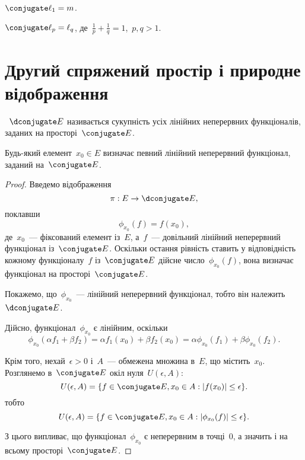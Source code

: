 \begin{example}
    $\conjugate \ell_1 = m$.
\end{example}

\begin{example}
    $\conjugate \ell_p = \ell_q$, де~$\frac{1}{p} + \frac{1}{q} = 1$,~$p, q > 1$.
\end{example}

\section{Другий спряжений простір і природне відображення}

\begin{definition}
    ~$\dconjugate E$ називається сукупність усіх лінійних неперервних функціоналів, заданих на просторі~$\conjugate E$.
\end{definition}

\begin{lemma}
    Будь-який елемент~$x_0 \in E$ визначає певний лінійний неперервний функціонал, заданий на~$\conjugate E$.
\end{lemma}

\begin{proof}
    Введемо відображення
    \begin{equation*}
        \pi: E \to \dconjugate E,
    \end{equation*}
    поклавши
    \begin{equation*}
        \phi_{x_0}(f) = f(x_0),
    \end{equation*}
    де~$x_0$~--- фіксований елемент із~$E$, а~$f$~--- довільний лінійний неперервний функціонал із~$\conjugate E$. Оскільки остання рівність ставить у відповідність кожному функціоналу~$f$ із~$\conjugate E$ дійсне число~$\phi_{x_0}(f)$, вона визначає функціонал на просторі~$\conjugate E$.
    
    Покажемо, що~$\phi_{x_0}$~--- лінійний неперервний функціонал, тобто він належить~$\dconjugate E$.
    
    Дійсно, функціонал~$\phi_{x_0}$ є лінійним, оскільки
    \begin{equation*}
        \phi_{x_0}(\alpha f_1 + \beta f_2) =
        \alpha f_1(x_0) + \beta f_2(x_0) =
        \alpha \phi_{x_0}(f_1) + \beta \phi_{x_0}(f_2).
    \end{equation*}
    
    Крім того, нехай~$\epsilon > 0$ і~$A$~--- обмежена множина в~$E$, що містить~$x_0$. Розглянемо в~$\conjugate E$ окіл нуля~$U(\epsilon, A)$:
    \begin{equation*}
        U(\epsilon, A) = \{f \in \conjugate E, x_0 \in A: |f(x_0)| \le \epsilon\}.
    \end{equation*}
    тобто
    \begin{equation*}
        U(\epsilon, A) = \{f \in \conjugate E, x_0 \in A: |\phi_{x_0}(f)| \le \epsilon\}.
    \end{equation*}

    З цього випливає, що функціонал~$\phi_{x_0}$ є неперервним в точці~$0$, а значить і на всьому просторі~$\conjugate E$. 
\end{proof}

